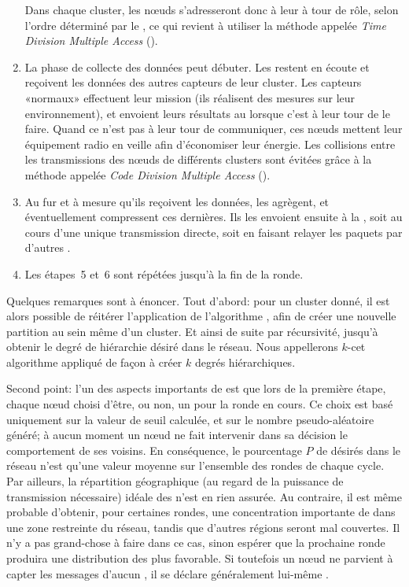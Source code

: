 \begin{enumerate}
        Dans chaque cluster, les nœuds s'adresseront donc à leur \ch à tour de rôle, selon l'ordre déterminé par le \CH, ce qui revient à utiliser la méthode appelée \textit{Time Division Multiple Access} (\tdma).
    \item La phase de collecte des données peut débuter.
        Les \chs restent en écoute et reçoivent les données des autres capteurs de leur cluster.
        Les capteurs «normaux» effectuent leur mission (ils réalisent des mesures sur leur environnement), et envoient leurs résultats au \ch lorsque c'est à leur tour de le faire.
        Quand ce n'est pas à leur tour de communiquer, ces nœuds mettent leur équipement radio en veille afin d'économiser leur énergie.
        Les collisions entre les transmissions des nœuds de différents clusters sont évitées grâce à la méthode appelée \textit{Code Division Multiple Access} (\cdma).
    \item Au fur et à mesure qu'ils reçoivent les données, les \chs agrègent, et éventuellement compressent ces dernières.
        Ils les envoient ensuite à la \sdb, soit au cours d'une unique transmission directe, soit en faisant relayer les paquets par d'autres \chs.
    \item Les étapes~5 et~6 sont répétées jusqu'à la fin de la ronde.
\end{enumerate}

Quelques remarques sont à énoncer.
Tout d'abord: pour un cluster donné, il est alors possible de réitérer l'application de l'algorithme \leach, afin de créer une nouvelle partition au sein même d'un cluster.
Et ainsi de suite par récursivité, jusqu'à obtenir le degré de hiérarchie désiré dans le réseau.
Nous appellerons $k$-\leach cet algorithme appliqué de façon à créer $k$ degrés hiérarchiques.

Second point: l'un des aspects importants de \leach est que lors de la première étape, chaque nœud choisi d'être, ou non, un \ch pour la ronde en cours.
Ce choix est basé uniquement sur la valeur de seuil calculée, et sur le nombre pseudo-aléatoire généré; à aucun moment un nœud ne fait intervenir dans sa décision le comportement de ses voisins.
En conséquence, le pourcentage $P$ de \chs désirés dans le réseau n'est qu'une valeur moyenne sur l'ensemble des rondes de chaque cycle.
Par ailleurs, la répartition géographique (au regard de la puissance de transmission nécessaire) idéale des \chs n'est en rien assurée.
Au contraire, il est même probable d'obtenir, pour certaines rondes, une concentration importante de \chs dans une zone restreinte du réseau, tandis que d'autres régions seront mal couvertes.
Il n'y a pas grand-chose à faire dans ce cas, sinon espérer que la prochaine ronde produira une distribution des \CHs plus favorable.
Si toutefois un nœud ne parvient à capter les messages d'aucun \CH, il se déclare généralement lui-même \ch.

